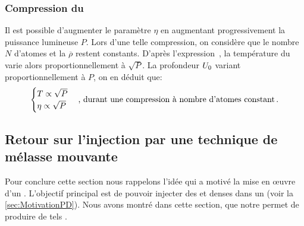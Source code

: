 \subsubsection{Compression du \n}
Il est possible d'augmenter le paramètre $\eta$ en augmentant progressivement la puissance lumineuse $P$. Lors d'une telle compression, on considère que le nombre $N$ d'atomes et la \dmdedpup $\overline{\rho}$ restent constants. D'après l'expression~, la température du \nat varie alors proportionnellement à $\sqrt{P}$.
La profondeur ${{U_0}}$ variant proportionnellement à $P$, on en déduit que:
\begin{equation}
\begin{cases}
T \propto \sqrt{P}\\
\eta \propto \sqrt{P}
\end{cases}
\text{, durant une compression à nombre d'atomes constant}
\pointformule
	\label{eq:PropTEtaCompression}
\end{equation}

\casse

\subsection{Retour sur l'injection par une technique de mélasse mouvante}
Pour conclure cette section nous rappelons l'idée qui a motivé la mise en \oe uvre d'un \pd. L'objectif principal est de pouvoir injecter des \patufs et denses dans un \gm (voir la \autoref{sec:MotivationPD}). Nous avons montré dans cette section, que notre \fld permet de produire de tels \ns. 

